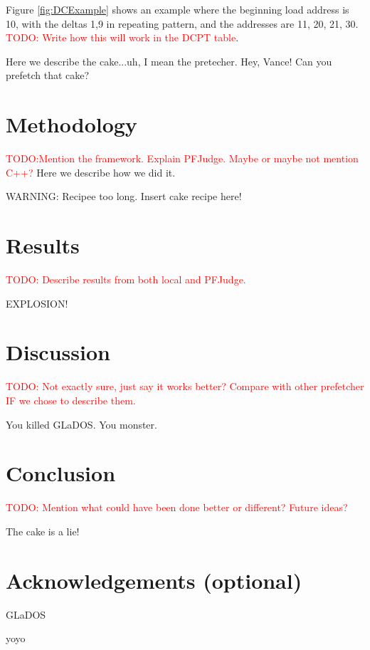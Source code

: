 \documentclass[a4paper]{IEEEtran}
\newcommand\TODO[1]{\textcolor{red}{TODO:#1}}
\newcommand\todo[1]{\TODO{#1}}
\begin{document}
Figure \ref{fig:DCExample} shows an example where the beginning load address is 10, with the deltas 1,9 in repeating pattern, and the addresses are 11, 20, 21, 30. 
\todo{ Write how this will work in the DCPT table}.


Here we describe the cake...uh, I mean the pretecher. Hey, Vance! Can you prefetch that cake?

\section{Methodology}

\todo{Mention the framework. Explain PFJudge. Maybe or maybe not mention C++?}
Here we describe how we did it.

WARNING: Recipee too long. Insert cake recipe here!

\section{Results}

\todo{ Describe results from both local and PFJudge.}

EXPLOSION!

\section{Discussion}

\todo{ Not exactly sure, just say it works better? Compare with other prefetcher IF we chose to describe them. }

You killed GLaDOS.
You monster.

\section{Conclusion}

\todo{ Mention what could have been done better or different? Future ideas? }

The cake is a lie!

\section{Acknowledgements (optional)}

GLaDOS

yoyo \cite{assignment-text}



\nocite{*}
\end{document}
